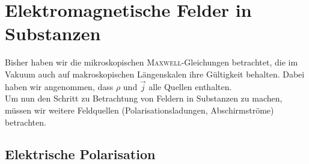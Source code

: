 \chapter{Elektromagnetische Felder in Substanzen}

Bisher haben wir die mikroskopischen \textsc{Maxwell}-Gleichungen betrachtet, die im Vakuum auch auf makroskopischen Längenskalen ihre Gültigkeit behalten. Dabei haben wir angenommen, dass $\rho$ und $\vec{j}$ alle Quellen enthalten. \\
Um nun den Schritt zu Betrachtung von Feldern in Substanzen zu machen, müssen wir weitere Feldquellen (Polarisationsladungen, Abschirmströme) betrachten.

\section{Elektrische Polarisation}

